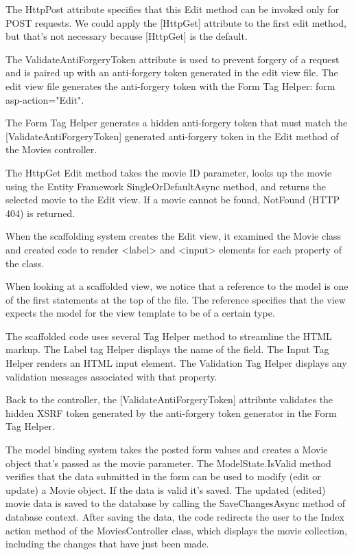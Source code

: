 \documentclass{report}
\begin{document}
    The HttpPost attribute specifies that this Edit method can be invoked
    only for POST requests. We could apply the [HttpGet] attribute to the
    first edit method, but that's not necessary because [HttpGet] is the
    default.

    The ValidateAntiForgeryToken attribute is used to prevent forgery of a
    request and is paired up with an anti-forgery token generated in the
    edit view file. The edit view file generates the anti-forgery token with
    the Form Tag Helper: form asp-action="Edit".

    The Form Tag Helper generates a hidden anti-forgery token that must match
    the [ValidateAntiForgeryToken] generated anti-forgery token in the Edit
    method of the Movies controller.

    The HttpGet Edit method takes the movie ID parameter, looks up the movie
    using the Entity Framework SingleOrDefaultAsync method, and returns the
    selected movie to the Edit view. If a movie cannot be found, NotFound (HTTP
    404) is returned.

    When the scaffolding system creates the Edit view, it examined the Movie class
    and created code to render <label> and <input> elements for each property of
    the class.

    When looking at a scaffolded view, we notice that a reference to the model is
    one of the first statements at the top of the file. The reference specifies that
    the view expects the model for the view template to be of a certain type.

    The scaffolded code uses several Tag Helper method to streamline the HTML
    markup. The Label tag Helper displays the name of the field. The Input Tag
    Helper renders an HTML input element. The Validation Tag Helper displays any
    validation messages associated with that property.

    Back to the controller, the [ValidateAntiForgeryToken] attribute validates the
    hidden XSRF token generated by the anti-forgery token generator in the Form Tag
    Helper.

    The model binding system takes the posted form values and creates a Movie object
    that's passed as the movie parameter. The ModelState.IsValid method verifies that
    the data submitted in the form can be used to modify (edit or update) a Movie object.
    If the data is valid it's saved. The updated (edited) movie data is saved to the
    database by calling the SaveChangesAsync method of database context. After saving
    the data, the code redirects the user to the Index action method of the
    MoviesController class, which displays the movie collection, including the changes
    that have just been made.
\end{document}
